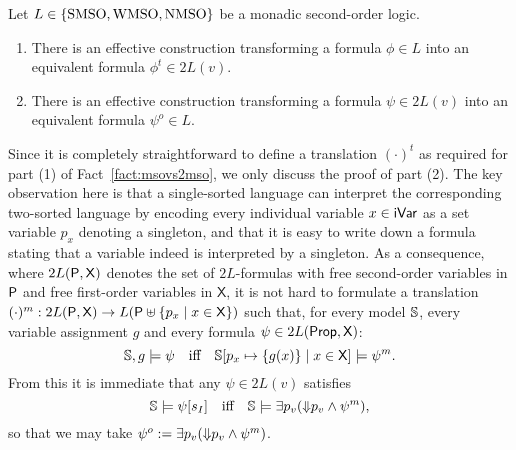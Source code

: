 \begin{fact}
\label{fact:msovs2mso}
Let $L \in \{\mathrm{SMSO}, \mathrm{WMSO}, \mathrm{NMSO}\}$ be a monadic second-order logic.
\begin{enumerate}
\item
There is an effective construction transforming a formula $\phi \in L$ into
an equivalent formula $\phi^{t} \in 2L(v)$.
\item
There is an effective construction transforming a formula $\psi \in 2L(v)$ into
an equivalent formula $\psi^{o} \in L$.
\end{enumerate}
\end{fact}

Since it is completely straightforward to define a translation $(\cdot)^{t}$ as 
required for part (1) of Fact~\ref{fact:msovs2mso}, we only discuss the proof 
of part (2). 
The key observation here is that a single-sorted language can interpret the 
corresponding two-sorted language by encoding every individual variable $x \in 
\mathsf{iVar}$ as a set variable $p_x$ denoting a singleton, and that it is easy to 
write down a formula stating that a variable indeed is interpreted by a 
singleton.
As a consequence, where $2L(\mathsf{P},\mathsf{X})$ denotes the set of
$2L$-formulas with free second-order variables in $\mathsf{P}$ and free first-order
variables in $\mathsf{X}$, it is not hard to formulate a translation 
$(\cdot)^{m} : 2L(\mathsf{P},\mathsf{X}) \to L(\mathsf{P} \uplus 
\{ p_{x} \mid x \in \mathsf{X} \})$
such that, for every model $\mathbb{S}$, every variable assignment $g$ and every
formula $\psi \in 2L(\mathsf{Prop},\mathsf{X})$:
\[
\bbS,g \models \psi \quad\text{iff}\quad 
\bbS[p_{x} \mapsto \{g(x)\} \mid x \in \mathsf{X}] \models \psi^m.
\]
From this it is immediate that any $\psi \in 2L(v)$ satisfies
\[
\bbS \models \psi[s_{I}]
\quad\text{iff}\quad 
\bbS \models \exists p_{v} (\here{p_{v}} \land \psi^{m}),
\]
so that we may take $\psi^{o} \mathrel{:=} \exists p_{v} ({\Downarrow}p_{v} \land 
\psi^{m})$.

